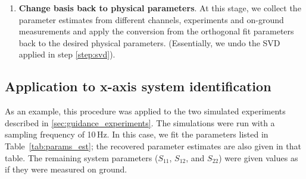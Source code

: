 \begin{enumerate}


\item \textbf{Change basis back to physical parameters}. At this stage, we collect
the parameter estimates from different channels,  experiments and on-ground measurements
and apply the conversion from the orthogonal fit parameters back to the desired physical
parameters. (Essentially, we undo the SVD applied in step \ref{step:svd}).

\end{enumerate}

\subsection{Application to x-axis system identification}

As an example, this procedure was applied to the two simulated experiments described
in \ref{sec:guidance_experiments}. The simulations were run with a sampling frequency
of 10\,Hz.  In this case, we fit the parameters listed in Table~\ref{tab:params_est}; the
recovered parameter estimates are also given in that table. The remaining system
parameters ($S_{11}$, $S_{12}$, and $S_{22}$) were given values as if they were
measured on ground.

